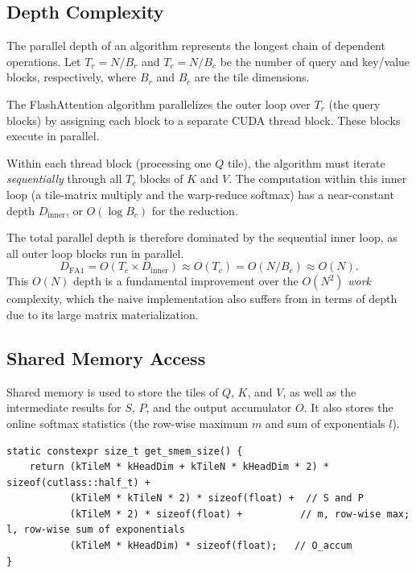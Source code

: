 \documentclass[11pt]{article}
\begin{document}
\subsection{Depth Complexity}

The parallel depth of an algorithm represents the longest chain of dependent operations. Let $T_r = N / B_r$ and $T_c = N / B_c$ be the number of query and key/value blocks, respectively, where $B_r$ and $B_c$ are the tile dimensions.

The FlashAttention algorithm parallelizes the outer loop over $T_r$ (the query blocks) by assigning each block to a separate CUDA thread block. These blocks execute in parallel.

Within each thread block (processing one $Q$ tile), the algorithm must iterate \textit{sequentially} through all $T_c$ blocks of $K$ and $V$. The computation within this inner loop (a tile-matrix multiply and the warp-reduce softmax) has a near-constant depth $D_{\text{inner}}$, or $O(\log B_c)$ for the reduction.

The total parallel depth is therefore dominated by the sequential inner loop, as all outer loop blocks run in parallel.
\[
D_{\text{FA1}} = O(T_c \times D_{\text{inner}}) \approx O(T_c) = O(N / B_c) \approx O(N).
\]
This $O(N)$ depth is a fundamental improvement over the $O(N^2)$ \textit{work} complexity, which the naive implementation also suffers from in terms of depth due to its large matrix materialization.

\subsection{Shared Memory Access}
\label{sec:mem-acc}

Shared memory is used to store the tiles of $Q$, $K$, and $V$, as well as the intermediate results for $S$, $P$, and the output accumulator $O$. It also stores the online softmax statistics (the row-wise maximum $m$ and sum of exponentials $l$).
\begin{lstlisting}
static constexpr size_t get_smem_size() {
    return (kTileM * kHeadDim + kTileN * kHeadDim * 2) * sizeof(cutlass::half_t) +
           (kTileM * kTileN * 2) * sizeof(float) +  // S and P
           (kTileM * 2) * sizeof(float) +          // m, row-wise max; l, row-wise sum of exponentials
           (kTileM * kHeadDim) * sizeof(float);   // O_accum
}
\end{lstlisting}
\end{document}
